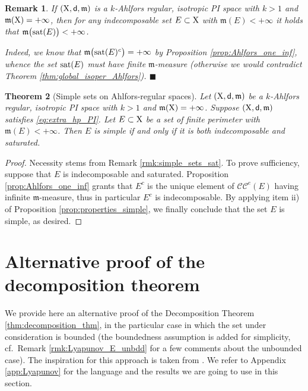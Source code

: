 \documentclass[reqno]{amsart}
\numberwithin{equation}{section}
\newcommand{\X}{{\rm X}}
\newcommand{\sfd}{{\sf d}}
\newcommand{\mm}{\mathfrak m}
\newcommand{\1}{\mathbbm 1}
\newcommand{\CC}{\mathcal{CC}^e}
\newcommand{\sat}{{\rm sat}}
\newcommand{\fr}{\penalty-20\null\hfill\(\blacksquare\)}
\newtheorem{theorem}{Theorem}[section]
\newtheorem{remark}[theorem]{Remark}
\begin{document}
%
%
\begin{remark}{\rm
If \((\X,\sfd,\mm)\) is a \(k\)-Ahlfors regular, isotropic PI space with
\(k>1\) and \(\mm(\X)=+\infty\),
then for any indecomposable set \(E\subset\X\) with \(\mm(E)<+\infty\) it holds that
\(\mm\big(\sat(E)\big)<+\infty\).

Indeed, we know that \(\mm\big(\sat(E)^c\big)=+\infty\) by Proposition
\ref{prop:Ahlfors_one_inf}, whence the set \(\sat(E)\) must have finite \(\mm\)-measure
(otherwise we would contradict Theorem \ref{thm:global_isoper_Ahlfors}).
\fr}\end{remark}
%
%
\begin{theorem}[Simple sets on Ahlfors-regular spaces]\label{thm:equiv_simple_Ahlfors}
Let \((\X,\sfd,\mm)\) be a \(k\)-Ahlfors regular, isotropic PI space
with \(k>1\) and \(\mm(\X)=+\infty\).
Suppose \((\X,\sfd,\mm)\) satisfies \eqref{eq:extra_hp_PI}.
Let \(E\subset\X\) be a set of finite perimeter with \(\mm(E)<+\infty\).
Then \(E\) is simple if and only if it is both indecomposable and saturated.
\end{theorem}
\begin{proof}
Necessity stems from Remark \ref{rmk:simple_sets_sat}. To prove sufficiency,
suppose that \(E\) is indecomposable and saturated. Proposition \ref{prop:Ahlfors_one_inf}
grants that \(E^c\) is the unique element of \(\CC(E)\) having infinite \(\mm\)-measure,
thus in particular \(E^c\) is indecomposable. By applying item ii) of Proposition
\ref{prop:properties_simple}, we finally conclude that the set \(E\) is simple, as desired.
\end{proof}
%
%
%
%
\section{Alternative proof of the decomposition theorem}\label{s:Lyapunov}
%
%
We provide here an alternative proof of the Decomposition Theorem \ref{thm:decomposition_thm},
in the particular case in which the set under consideration is bounded
(the boundedness assumption is added for simplicity, cf.\ Remark 
\ref{rmk:Lyapunov_E_unbdd} for a few comments about the unbounded case).
The inspiration for this approach is taken from \cite{Kirchheim98}.
We refer to Appendix \ref{app:Lyapunov} for the language and the results 
we are going to use in this section.
\medskip
\end{document}
